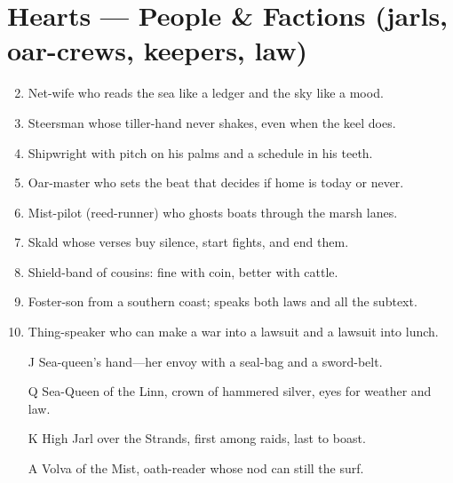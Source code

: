 \section*{Hearts --- People \& Factions (jarls, oar-crews, keepers, law)}
\begin{enumerate}
\setcounter{enumi}{1}
\item Net-wife who reads the sea like a ledger and the sky like a mood.
\item Steersman whose tiller-hand never shakes, even when the keel does.
\item Shipwright with pitch on his palms and a schedule in his teeth.
\item Oar-master who sets the beat that decides if home is today or never.
\item Mist-pilot (reed-runner) who ghosts boats through the marsh lanes.
\item Skald whose verses buy silence, start fights, and end them.
\item Shield-band of cousins: fine with coin, better with cattle.
\item Foster-son from a southern coast; speaks both laws and all the subtext.
\item Thing-speaker who can make a war into a lawsuit and a lawsuit into lunch.
\item[J] Sea-queen's hand---her envoy with a seal-bag and a sword-belt.
\item[Q] Sea-Queen of the Linn, crown of hammered silver, eyes for weather and law.
\item[K] High Jarl over the Strands, first among raids, last to boast.
\item[A] Volva of the Mist, oath-reader whose nod can still the surf.
\end{enumerate}

